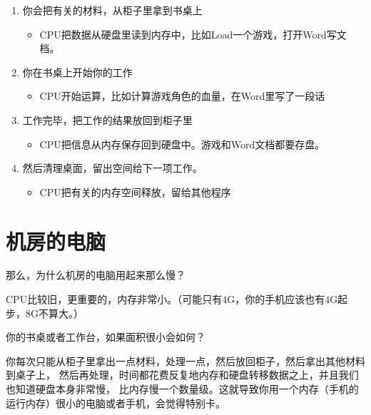 \documentclass[
  letterpaper,
  DIV=11,
  numbers=noendperiod]{scrreprt}
\providecommand{\tightlist}{%
  \setlength{\itemsep}{0pt}\setlength{\parskip}{0pt}}\usepackage{longtable,booktabs,array}
\begin{document}
\begin{enumerate}
\def\labelenumi{\arabic{enumi}.}
\tightlist
\item
  你会把有关的材料，从柜子里拿到书桌上

  \begin{itemize}
  \tightlist
  \item
    CPU把数据从硬盘里读到内存中，比如Load一个游戏，打开Word写文档。
  \end{itemize}
\item
  你在书桌上开始你的工作

  \begin{itemize}
  \tightlist
  \item
    CPU开始运算，比如计算游戏角色的血量，在Word里写了一段话
  \end{itemize}
\item
  工作完毕，把工作的结果放回到柜子里

  \begin{itemize}
  \tightlist
  \item
    CPU把信息从内存保存回到硬盘中。游戏和Word文档都要存盘。
  \end{itemize}
\item
  然后清理桌面，留出空间给下一项工作。

  \begin{itemize}
  \tightlist
  \item
    CPU把有关的内存空间释放，留给其他程序
  \end{itemize}
\end{enumerate}

\hypertarget{ux673aux623fux7684ux7535ux8111}{%
\section*{机房的电脑}\label{ux673aux623fux7684ux7535ux8111}}


那么，为什么机房的电脑用起来那么慢？

CPU比较旧，更重要的，内存非常小。（可能只有4G，你的手机应该也有4G起步，8G不算大。）

你的书桌或者工作台，如果面积很小会如何？

你每次只能从柜子里拿出一点材料，处理一点，然后放回柜子，然后拿出其他材料到桌子上，
然后再处理，时间都花费反复地内存和硬盘转移数据之上，并且我们也知道硬盘本身非常慢，
比内存慢一个数量级。这就导致你用一个内存（手机的运行内存）很小的电脑或者手机，会觉得特别卡。
\end{document}
